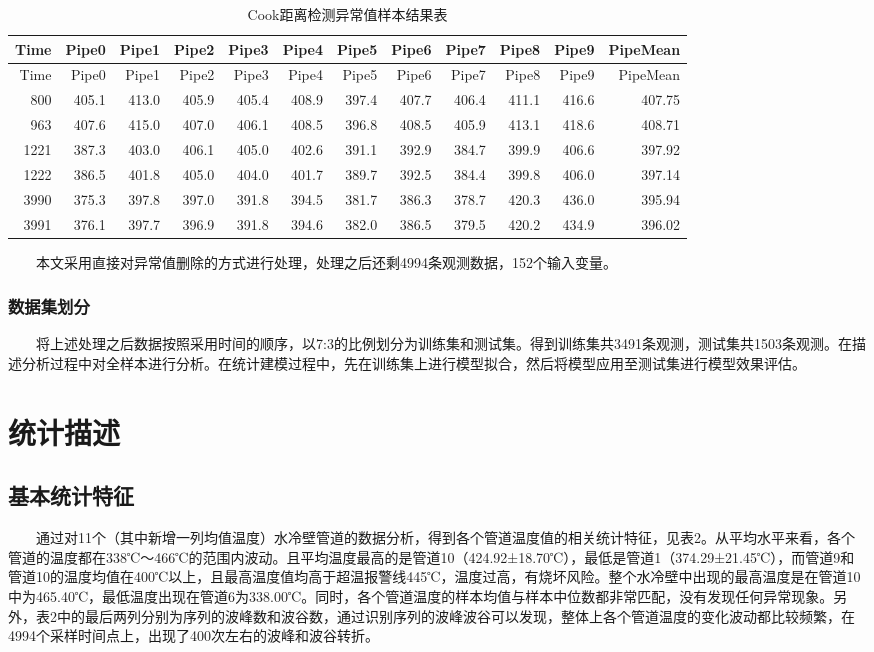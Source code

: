 \documentclass[
]{article}
\begin{document}
\begin{longtable}[]{@{}rrrrrrrrrrrr@{}}
\caption{Cook距离检测异常值样本结果表}\tabularnewline
\toprule
Time & Pipe0 & Pipe1 & Pipe2 & Pipe3 & Pipe4 & Pipe5 & Pipe6 & Pipe7 &
Pipe8 & Pipe9 & PipeMean\tabularnewline
\midrule
\endfirsthead
\toprule
Time & Pipe0 & Pipe1 & Pipe2 & Pipe3 & Pipe4 & Pipe5 & Pipe6 & Pipe7 &
Pipe8 & Pipe9 & PipeMean\tabularnewline
\midrule
\endhead
800 & 405.1 & 413.0 & 405.9 & 405.4 & 408.9 & 397.4 & 407.7 & 406.4 &
411.1 & 416.6 & 407.75\tabularnewline
963 & 407.6 & 415.0 & 407.0 & 406.1 & 408.5 & 396.8 & 408.5 & 405.9 &
413.1 & 418.6 & 408.71\tabularnewline
1221 & 387.3 & 403.0 & 406.1 & 405.0 & 402.6 & 391.1 & 392.9 & 384.7 &
399.9 & 406.6 & 397.92\tabularnewline
1222 & 386.5 & 401.8 & 405.0 & 404.0 & 401.7 & 389.7 & 392.5 & 384.4 &
399.8 & 406.0 & 397.14\tabularnewline
3990 & 375.3 & 397.8 & 397.0 & 391.8 & 394.5 & 381.7 & 386.3 & 378.7 &
420.3 & 436.0 & 395.94\tabularnewline
3991 & 376.1 & 397.7 & 396.9 & 391.8 & 394.6 & 382.0 & 386.5 & 379.5 &
420.2 & 434.9 & 396.02\tabularnewline
\bottomrule
\end{longtable}

  本文采用直接对异常值删除的方式进行处理，处理之后还剩4994条观测数据，152个输入变量。

\hypertarget{ux6570ux636eux96c6ux5212ux5206}{%
\subsubsection{数据集划分}\label{ux6570ux636eux96c6ux5212ux5206}}

  将上述处理之后数据按照采用时间的顺序，以7:3的比例划分为训练集和测试集。得到训练集共3491条观测，测试集共1503条观测。在描述分析过程中对全样本进行分析。在统计建模过程中，先在训练集上进行模型拟合，然后将模型应用至测试集进行模型效果评估。

\hypertarget{ux7edfux8ba1ux63cfux8ff0}{%
\section{统计描述}\label{ux7edfux8ba1ux63cfux8ff0}}

\hypertarget{ux57faux672cux7edfux8ba1ux7279ux5f81}{%
\subsection{基本统计特征}\label{ux57faux672cux7edfux8ba1ux7279ux5f81}}

  通过对11个（其中新增一列均值温度）水冷壁管道的数据分析，得到各个管道温度值的相关统计特征，见表2。从平均水平来看，各个管道的温度都在338℃～466℃的范围内波动。且平均温度最高的是管道10（424.92±18.70℃），最低是管道1（374.29±21.45℃），而管道9和管道10的温度均值在400℃以上，且最高温度值均高于超温报警线445℃，温度过高，有烧坏风险。整个水冷壁中出现的最高温度是在管道10中为465.40℃，最低温度出现在管道6为338.00℃。同时，各个管道温度的样本均值与样本中位数都非常匹配，没有发现任何异常现象。另外，表2中的最后两列分别为序列的波峰数和波谷数，通过识别序列的波峰波谷可以发现，整体上各个管道温度的变化波动都比较频繁，在4994个采样时间点上，出现了400次左右的波峰和波谷转折。
\end{document}
